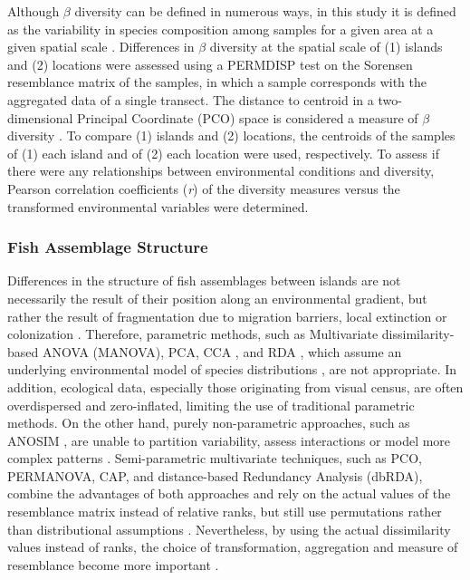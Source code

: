 \documentclass[jmse,article,accept,moreauthors,pdftex]{Definitions/mdpi}
\begin{document}
Although $\beta$ diversity can be defined in numerous ways, in this study it is defined as the variability in species composition among samples for a given area at a given spatial scale \citep{Anderson2006MultivariateDiversity,Whittaker1975CommunitiesEcosystems,Whittaker2001ScaleDiversity}. Differences in $\beta$ diversity at the spatial scale of (1) islands and (2) locations were assessed using a PERMDISP test on the Sorensen resemblance matrix of the samples, in which a sample corresponds with the aggregated data of a single transect. The distance to centroid in a two-dimensional Principal Coordinate (PCO) space is considered a measure of $\beta$ diversity \citep{Anderson2006MultivariateDiversity}. To compare (1) islands and (2) locations, the centroids of the samples of (1) each island and of (2) each location were used, respectively. To assess if there were any relationships between environmental conditions and diversity, Pearson correlation coefficients (\textit{r}) of the diversity measures versus the transformed environmental variables were determined. 

\subsubsection{Fish Assemblage Structure}
\label{sect:struct}

Differences in the structure of fish assemblages between islands are not necessarily the result of their position along an environmental gradient, but rather the result of fragmentation due to migration barriers, local extinction or colonization \citep{Whittaker1998IslandConservation,Whittaker2017IslandLaboratories}. Therefore, parametric methods, such as Multivariate dissimilarity-based ANOVA (MANOVA), PCA, CCA%
, and RDA%
, which assume an underlying environmental model of species distributions \citep{TerBraak1988AAnalysis}, are not appropriate. In addition, ecological data, especially those originating from visual census, are often overdispersed and zero-inflated, limiting the use of traditional parametric methods. On the other hand, purely non-parametric approaches, such as ANOSIM%
, are unable to partition variability, assess interactions or model more complex patterns \citep{Anderson2008PERMANOVA+Methods}. Semi-parametric multivariate techniques, such as PCO, PERMANOVA, CAP, and distance-based Redundancy Analysis (dbRDA), combine the advantages of both approaches and rely on the actual values of the resemblance matrix instead of relative ranks, but still use permutations rather than distributional assumptions \citep{Anderson2008PERMANOVA+Methods}. Nevertheless, by using the actual dissimilarity values instead of ranks, the choice of transformation, aggregation and measure of resemblance become more important \citep{Anderson2008PERMANOVA+Methods}. 
\end{document}
